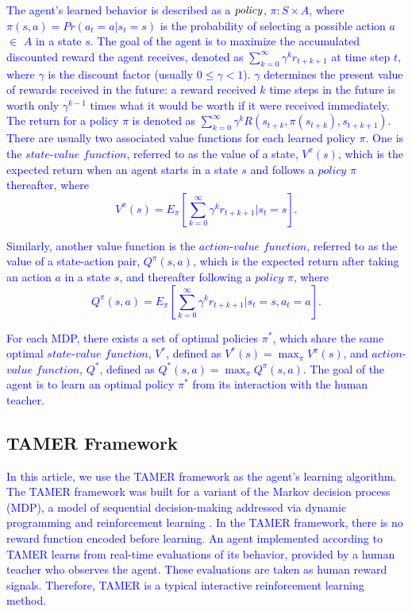 \textcolor{blue}{The agent's learned behavior is described as a $\it{policy}$, $\pi : S \times A$, where $\pi(s,a) = Pr(a_{t}=a|s_{t}=s)$ is the probability of selecting a possible action $a$ $\in$ $A$ in a state $s$. The goal of the agent is to maximize the accumulated discounted reward %
the agent receives, denoted as $\sum_{k=0}^{\infty}\gamma^{k}r_{t+k+1}$ at time step $t$, where $\gamma$ is the discount factor (usually $0 \leq \gamma < 1$). $\gamma$ determines the present value of rewards received in the future: a reward received $k$ time steps in the future is worth only $\gamma^{k-1}$ times what it would be worth if it were received immediately. The return for a policy $\pi$ is denoted as $\sum_{k=0}^{\infty}\gamma^{k}R(s_{t+k}, \pi(s_{t+k}), s_{t+k+1})$.  There are usually two associated value functions for each learned policy $\pi$. One is the $state$-$value$ $function$, referred to as the value of a state,  $V^{\pi}(s)$, which is the expected return when an agent starts in a state $s$ and follows a $policy$ $\pi$ thereafter, where
\begin{equation}
    V^{\pi}(s) = E_{\pi}\left[ \sum_{k=0}^{\infty}\gamma^{k}r_{t+k+1} | s_{t} = s\right].
\end{equation}
}

\textcolor{blue}{Similarly, another value function is the $action$-$value$ $function$, referred to as the value of a state-action pair,  $Q^{\pi}(s,a)$,  which is the expected return after taking an action $a$ in a state $s$, and thereafter following a $policy$ $\pi$, where
\begin{equation}
    Q^{\pi}(s, a) = E_{\pi}\left[ \sum_{k=0}^{\infty}\gamma^{k}r_{t+k+1} | s_{t} = s, a_{t} = a\right].
\end{equation}
}

\textcolor{blue}{For each MDP, there exists a set of optimal policies $\pi^{\ast}$, which share the same optimal $state$-$value$ $function$, $V^{\ast}$, defined as $V^{\ast}(s) = \max_{\pi}V^{\pi}(s)$, %
and $action$-$value$ $function$, $Q^{\ast}$, defined as $Q^{\ast}(s, a) = \max_{\pi}Q^{\pi}(s, a)$. The goal of the agent is to learn an optimal policy $\pi^{\ast}$ from its interaction with the human teacher.}

\subsection{TAMER Framework}
\label{sec:tamer}

\textcolor{blue}{In this article, we use the TAMER framework \cite{knox2009interactively} as the agent's learning algorithm. The TAMER framework was built for a variant of the Markov decision process (MDP), a model of se\-quen\-tial de\-ci\-sion-making addressed via dynamic programming \cite{howard1960dynamic} and reinforcement learning \cite{sutton1998reinforcement}. In the TAMER framework, there is no reward function encoded before learning. An agent implemented according to TAMER learns from real-time evaluations of its behavior, provided by a human teacher who observes the agent. These evaluations are taken as human reward signals. Therefore, TAMER is a typical interactive reinforcement learning method.}

